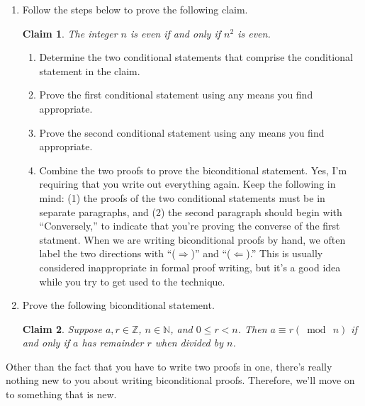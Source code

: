 \documentclass[12 pt]{article}
\newcommand{\Z}{\mathbb{Z}}
\newcommand{\N}{\mathbb{N}}
\theoremstyle{definition}
\theoremstyle{plain}
\theoremstyle{mytheorem}
\theoremstyle{myexample}
\newtheorem{claim}{Claim}
\theoremstyle{mydefinition}
\begin{document}
\begin{enumerate}
\item Follow the steps below to prove the following claim.
\begin{claim} The integer $n$ is even if and only if $n^2$ is even.
\end{claim}
	\begin{enumerate}[label=(\alph*)]
	\item Determine the two conditional statements that comprise the conditional statement in the claim.
	\vspace{1in}
	\item Prove the first conditional statement using any means you find appropriate.
	\vspace{2in}
	\item Prove the second conditional statement using any means you find appropriate.
	\vspace{2in}
	\item Combine the two proofs to prove the biconditional statement.  Yes, I'm requiring that you write out everything again.  Keep the following in mind: (1) the proofs of the two conditional statements must be in separate paragraphs, and (2) the second paragraph should begin with ``Conversely,'' to indicate that you're proving the converse of the first statment.  When we are writing biconditional proofs by hand, we often label the two directions with ``($\Rightarrow$)'' and ``($\Leftarrow$).''  This is usually considered inappropriate in formal proof writing, but it's a good idea while you try to get used to the technique.

	\end{enumerate}
	\newpage
\item Prove the following biconditional statement.
\begin{claim} Suppose $a,r \in \Z$, $n \in \N$, and $0 \leq r <n$.  Then $a \equiv r (\bmod \ n)$ if and only if $a$ has remainder $r$ when divided by $n$.
\end{claim}
\vspace{4in}
\end{enumerate}
\noindent  Other than the fact that you have to write two proofs in one, there's really nothing new to you about writing biconditional proofs.  Therefore, we'll move on to something that is new.
\end{document}
